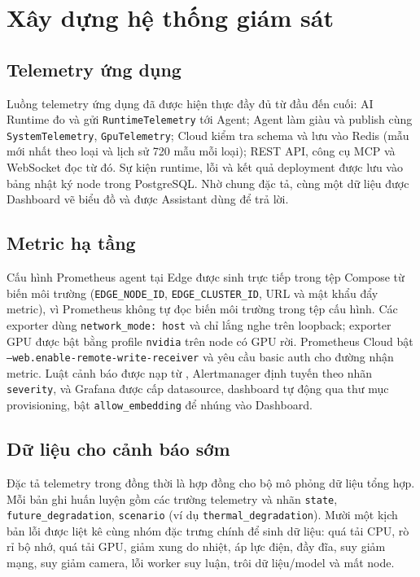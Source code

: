 \section{Xây dựng hệ thống giám sát}

\subsection{Telemetry ứng dụng}

Luồng telemetry ứng dụng đã được hiện thực đầy đủ từ đầu đến cuối: AI Runtime
đo và gửi \texttt{RuntimeTelemetry} tới Agent; Agent làm giàu và publish cùng
\texttt{SystemTelemetry}, \texttt{GpuTelemetry}; Cloud kiểm tra schema và lưu
vào Redis (mẫu mới nhất theo loại và lịch sử 720 mẫu mỗi loại); REST API, công cụ
MCP và WebSocket đọc từ đó. Sự kiện runtime, lỗi và kết quả deployment được lưu
vào bảng nhật ký node trong PostgreSQL. Nhờ chung đặc tả, cùng một dữ liệu được
Dashboard vẽ biểu đồ và được Assistant dùng để trả lời.

\subsection{Metric hạ tầng}

Cấu hình Prometheus agent tại Edge được sinh trực tiếp trong tệp Compose từ biến
môi trường (\texttt{EDGE\_NODE\_ID}, \texttt{EDGE\_CLUSTER\_ID}, URL và mật khẩu
đẩy metric), vì Prometheus không tự đọc biến môi trường trong tệp cấu hình. Các
exporter dùng \texttt{network\_mode: host} và chỉ lắng nghe trên loopback; exporter
GPU được bật bằng profile \texttt{nvidia} trên node có GPU rời. Prometheus Cloud
bật \texttt{--web.enable-remote-write-receiver} và yêu cầu basic auth cho đường
nhận metric. Luật cảnh báo được nạp từ ,
Alertmanager định tuyến theo nhãn \texttt{severity}, và Grafana được cấp datasource,
dashboard tự động qua thư mục provisioning, bật \texttt{allow\_embedding} để nhúng
vào Dashboard.

\subsection{Dữ liệu cho cảnh báo sớm}

Đặc tả telemetry trong  đồng thời là hợp
đồng cho bộ mô phỏng dữ liệu tổng hợp. Mỗi bản ghi huấn luyện gồm các trường
telemetry và nhãn \texttt{state}, \texttt{future\_degradation}, \texttt{scenario}
(ví dụ \texttt{thermal\_degradation}). Mười một kịch bản lỗi được liệt kê cùng
nhóm đặc trưng chính để sinh dữ liệu: quá tải CPU, rò rỉ bộ nhớ, quá tải GPU, giảm
xung do nhiệt, áp lực điện, đầy đĩa, suy giảm mạng, suy giảm camera, lỗi worker
suy luận, trôi dữ liệu/model và mất node.
